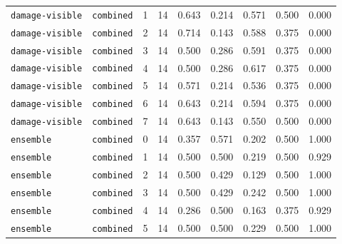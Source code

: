 \documentclass{article}
\begin{document}
\begin{center}
\begin{tabular}{llccccccc}
\texttt{damage-visible} & \texttt{combined} & 1 & 14 & 0.643 & 0.214 & 0.571 & 0.500 & 0.000 \\
\texttt{damage-visible} & \texttt{combined} & 2 & 14 & 0.714 & 0.143 & 0.588 & 0.375 & 0.000 \\
\texttt{damage-visible} & \texttt{combined} & 3 & 14 & 0.500 & 0.286 & 0.591 & 0.375 & 0.000 \\
\texttt{damage-visible} & \texttt{combined} & 4 & 14 & 0.500 & 0.286 & 0.617 & 0.375 & 0.000 \\
\texttt{damage-visible} & \texttt{combined} & 5 & 14 & 0.571 & 0.214 & 0.536 & 0.375 & 0.000 \\
\texttt{damage-visible} & \texttt{combined} & 6 & 14 & 0.643 & 0.214 & 0.594 & 0.375 & 0.000 \\
\texttt{damage-visible} & \texttt{combined} & 7 & 14 & 0.643 & 0.143 & 0.550 & 0.500 & 0.000 \\
\texttt{ensemble} & \texttt{combined} & 0 & 14 & 0.357 & 0.571 & 0.202 & 0.500 & 1.000 \\
\texttt{ensemble} & \texttt{combined} & 1 & 14 & 0.500 & 0.500 & 0.219 & 0.500 & 0.929 \\
\texttt{ensemble} & \texttt{combined} & 2 & 14 & 0.500 & 0.429 & 0.129 & 0.500 & 1.000 \\
\texttt{ensemble} & \texttt{combined} & 3 & 14 & 0.500 & 0.429 & 0.242 & 0.500 & 1.000 \\
\texttt{ensemble} & \texttt{combined} & 4 & 14 & 0.286 & 0.500 & 0.163 & 0.375 & 0.929 \\
\texttt{ensemble} & \texttt{combined} & 5 & 14 & 0.500 & 0.500 & 0.229 & 0.500 & 1.000 \\
\bottomrule
\end{tabular}
\end{center}
\end{document}
